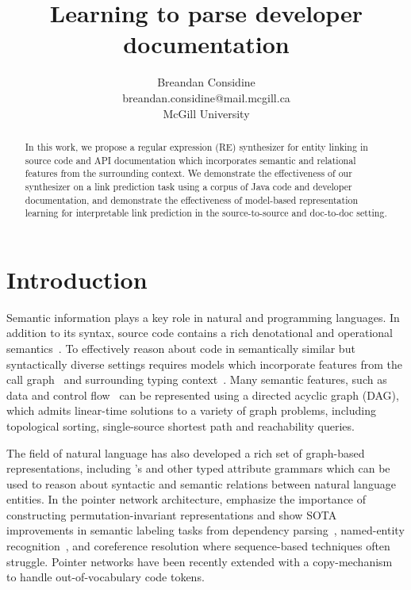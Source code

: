 \documentclass{article}
\title{Learning to parse developer documentation}
\author{Breandan Considine\\
breandan.considine@mail.mcgill.ca\\
McGill University}
\begin{document}
\maketitle

\begin{abstract}
In this work, we propose a regular expression (RE) synthesizer for entity linking in source code and API documentation which incorporates semantic and relational features from the surrounding context. We demonstrate the effectiveness of our synthesizer on a link prediction task using a corpus of Java code and developer documentation, and demonstrate the effectiveness of model-based representation learning for interpretable link prediction in the source-to-source and doc-to-doc setting.
\end{abstract}

\section{Introduction}

Semantic information plays a key role in natural and programming languages. In addition to its syntax, source code contains a rich denotational and operational semantics~\citep{henkel2018code}. To effectively reason about code in semantically similar but syntactically diverse settings requires models which incorporate features from the call graph~\citep{gu2016deep, gu2018deep, liu2019neural} and surrounding typing context~\citep{allamanis2017learning}. Many semantic features, such as data and control flow~\citep{si2018learning} can be represented using a directed acyclic graph (DAG), which admits linear-time solutions to a variety of graph problems, including topological sorting, single-source shortest path and reachability queries.

The field of natural language has also developed a rich set of graph-based representations, including \citet{reddy2016transforming}'s and other typed attribute grammars which can be used to reason about syntactic and semantic relations between natural language entities. In the pointer network architecture, \citet{vinyals2015pointer, vinyals2015order} emphasize the importance of constructing  permutation-invariant representations and show SOTA improvements in semantic labeling tasks from dependency parsing~\citep{ma2018stack}, named-entity recognition~\citep{lample2016neural}, and coreference resolution where sequence-based techniques often struggle. Pointer networks have been recently extended with a copy-mechanism~\citep{li2017code} to handle out-of-vocabulary code tokens.
\end{document}
